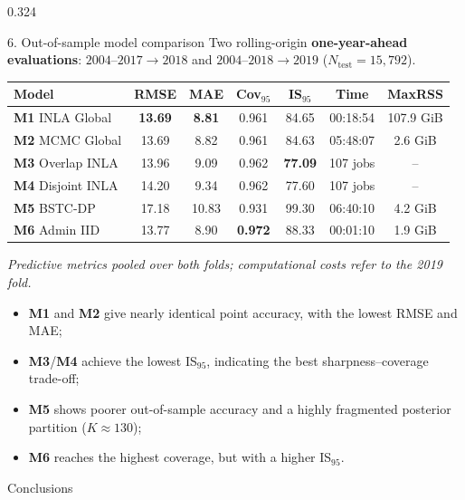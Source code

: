 \documentclass[final]{beamer}
\newcommand{\model}[1]{\textbf{#1}}
\newcommand{\smallgap}{\vspace{0.25cm}}
\begin{document}
\begin{frame}[t]
\begin{columns}[t,totalwidth=\textwidth]
\begin{column}{0.324\textwidth}
\begin{block}{6. Out-of-sample model comparison}
\justifying
Two rolling-origin \textbf{one-year-ahead evaluations}:
$2004$--$2017\!\rightarrow\!2018$ and
$2004$--$2018\!\rightarrow\!2019$
($N_{\mathrm{test}}=15{,}792$).

\vspace{0.5cm}
\centering
\footnotesize
\setlength{\tabcolsep}{3.5pt}
\begin{tabular}{lcccccc}
\toprule
\textbf{Model} & \textbf{RMSE} & \textbf{MAE} &
\textbf{Cov$_{95}$} & \textbf{IS$_{95}$} &
\textbf{Time} & \textbf{MaxRSS} \\
\midrule
\model{M1} INLA Global   & \textbf{13.69} & \textbf{8.81} & 0.961 & 84.65 & 00:18:54 & 107.9 GiB \\
\model{M2} MCMC Global   & 13.69 & 8.82 & 0.961 & 84.63 & 05:48:07 & 2.6 GiB \\
\model{M3} Overlap INLA  & 13.96 & 9.09 & 0.962 & \textbf{77.09} & 107 jobs & -- \\
\model{M4} Disjoint INLA & 14.20 & 9.34 & 0.962 & 77.60 & 107 jobs & -- \\
\model{M5} BSTC-DP       & 17.18 & 10.83 & 0.931 & 99.30 & 06:40:10 & 4.2 GiB \\
\model{M6} Admin IID     & 13.77 & 8.90 & \textbf{0.972} & 88.33 & 00:01:10 & 1.9 GiB \\
\bottomrule
\end{tabular}

{\scriptsize\textit{
Predictive metrics pooled over both folds; computational costs refer to the 2019 fold.}}

\vspace{0.5cm}
\justifying
\normalsize
\begin{itemize}
  \item \model{M1} and \model{M2} give nearly identical point accuracy, with the lowest RMSE and MAE;
  \item \model{M3}/\model{M4} achieve the lowest IS$_{95}$, indicating the
  best sharpness--coverage trade-off;
  \item \model{M5} shows poorer out-of-sample accuracy and a highly fragmented posterior partition ($K\approx130$);
  \item \model{M6} reaches the highest coverage, but with a higher IS$_{95}$.
\end{itemize}
\end{block}

\smallgap
\begin{block}{Conclusions}


\end{block}
\end{column}
\end{columns}
\end{frame}
\end{document}
